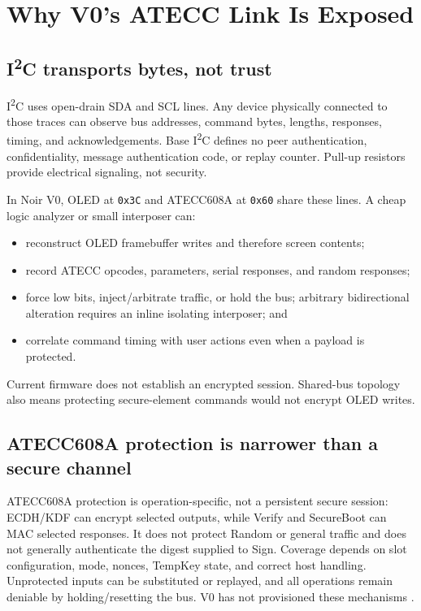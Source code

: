 \documentclass[10pt]{article}
\begin{document}
\section{Why V0's ATECC Link Is Exposed}
\subsection{\texorpdfstring{I\textsuperscript{2}C}{I2C} transports bytes, not trust}
I\textsuperscript{2}C uses open-drain SDA and SCL lines. Any device physically
connected to those traces can observe bus addresses, command bytes, lengths,
responses, timing, and acknowledgements. Base I\textsuperscript{2}C defines no
peer authentication, confidentiality, message authentication code, or replay
counter. Pull-up resistors provide electrical signaling, not security.

In Noir V0, OLED at \texttt{0x3C} and ATECC608A at \texttt{0x60} share these
lines. A cheap logic analyzer or small interposer can:
\begin{itemize}
  \item reconstruct OLED framebuffer writes and therefore screen contents;
  \item record ATECC opcodes, parameters, serial responses, and random responses;
  \item force low bits, inject/arbitrate traffic, or hold the bus; arbitrary
        bidirectional alteration requires an inline isolating interposer; and
  \item correlate command timing with user actions even when a payload is protected.
\end{itemize}
Current firmware does not establish an encrypted session. Shared-bus topology
also means protecting secure-element commands would not encrypt OLED writes.

\subsection{ATECC608A protection is narrower than a secure channel}
ATECC608A protection is operation-specific, not a persistent secure session:
ECDH/KDF can encrypt selected outputs, while Verify and SecureBoot can MAC
selected responses. It does not protect Random or general traffic and does not
generally authenticate the digest supplied to Sign. Coverage depends on slot
configuration, mode, nonces, TempKey state, and correct host handling.
Unprotected inputs can be substituted or replayed, and all operations remain
deniable by holding/resetting the bus. V0 has not provisioned these mechanisms
\cite{atecc-ds,atecc-io}.
\end{document}
